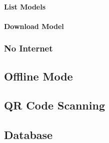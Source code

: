             \paragraph{List Models}
            
            \paragraph{Download Model}
        
        \subsubsection{No Internet}
        
    \subsection{Offline Mode}

    \subsection{QR Code Scanning}

    \subsection{Database}
